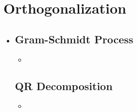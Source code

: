 \section{Orthogonalization}\label{Orthogonalization}
\begin{itemize}
  \item

  \subsection{Gram-Schmidt Process}\label{Gram-Schmidt Process}
  \begin{itemize}
    \item 
  \end{itemize}

  \subsection{QR Decomposition}\label{QR Decomposition}
  \begin{itemize}
    \item 
  \end{itemize}
  
  
\end{itemize}
